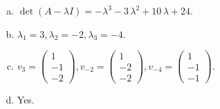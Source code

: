 \begin{questions}
\begin{solution}
\begin{enumerate}[(a)]
\item $\det(A-\lambda I)=-{\lambda}^{3} - 3 \, {\lambda}^{2} + 10 \, {\lambda} + 24$.
\item ${\lambda}_1=3, {\lambda}_2=-2, {\lambda}_3=-4$.
\item $v_{3}=\left(\begin{array}{r}
1 \\
-1 \\
-2
\end{array}\right), v_{-2}=\left(\begin{array}{r}
1 \\
-2 \\
-2
\end{array}\right), v_{-4}=\left(\begin{array}{r}
1 \\
-1 \\
-1
\end{array}\right)$.
\item Yes.
\end{enumerate}
\end{solution}

\end{questions}

\newpage


\begin{center}
\end{center}

